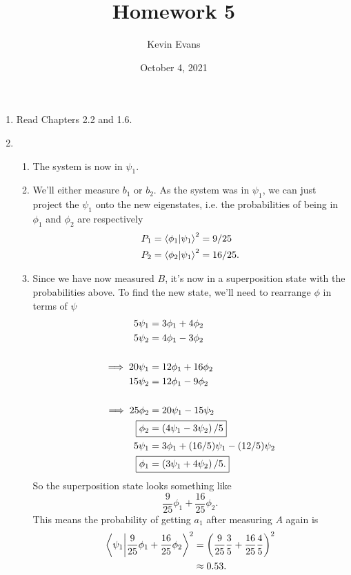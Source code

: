 \documentclass{homework}
\title{Homework 5}
\author{Kevin Evans}
\date{October 4, 2021}
\begin{document}
	\maketitle
	\begin{enumerate}
		\item Read Chapters 2.2 and 1.6.
		\item %
			\begin{enumerate}
				\item The system is now in $\psi_1$.
				
				\item We'll either measure $b_1$ or $b_2$. As the system was in $\psi_1$, we can just project the $\psi_1$ onto the new eigenstates, i.e. the probabilities of being in $\phi_1$ and $\phi_2$ are respectively \begin{align*}
					P_1 & = \braket{\phi_1}{\psi_1}^2 = 9/25  \\
					P_2 & = \braket{\phi_2}{\psi_1}^2 = 16/25.
				\end{align*}
				
				\item Since we have now measured $B$, it's now in a superposition state with the probabilities above. To find the new state, we'll need to rearrange $\phi$ in terms of $\psi$ \begin{align*}
					5 \psi_1 & = 3 \phi_1 + 4 \phi_2 \\
					5 \psi_2 & = 4 \phi_1 - 3 \phi_2 \\ \\
					\implies 20 \psi_1 & = 12 \phi_1 + 16 \phi_2 \\
					15 \psi_2 & = 12 \phi_1 - 9 \phi_2 \\ \\
					\implies 25 \phi_2 & = 20 \psi_1 - 15 \psi_2 \\
					\Aboxed{ \phi_2 & = \left( 4 \psi_1 - 3 \psi_2 \right) / 5 } \\
					5 \psi_1 & = 3 \phi_1 + (16/5) \psi_1 - (12/5) \psi_2 \\
					\Aboxed{ \phi_1 & = \left(3 \psi_1 + 4 \psi_2\right) / 5. }
				\end{align*}
				So the superposition state looks something like
				\[\frac{9}{25} \phi_1 + \frac{16}{25} \phi_2.\]
				This means the probability of getting $a_1$ after measuring $A$ again is \begin{align*}
					\braket{\psi_1}{\frac{9}{25} \phi_1 + \frac{16}{25} \phi_2}^2 & = \left(
						\frac{9}{25} \frac{3}{5}
						+ \frac{16}{25} \frac{4}{5}
					\right)^2 \\
						& \approx 0.53.
				\end{align*}
			\end{enumerate}
		

\end{enumerate}
\end{document}
